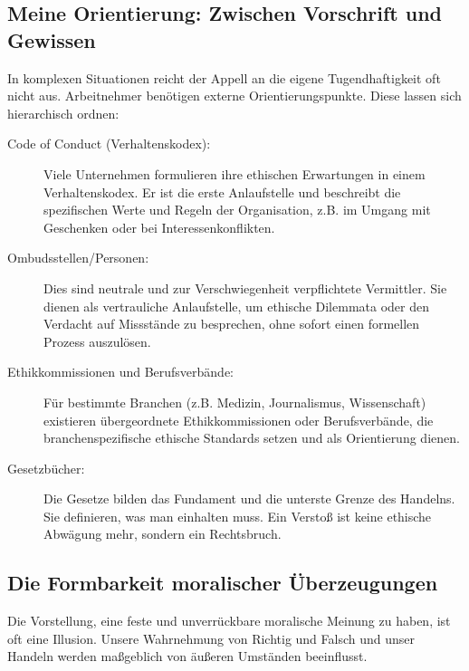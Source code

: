 \documentclass[
    12pt,               %
    a4paper,            %
    ngerman             %
]{scrartcl}
\begin{document}
\subsection{Meine Orientierung: Zwischen Vorschrift und Gewissen}
In komplexen Situationen reicht der Appell an die eigene Tugendhaftigkeit oft nicht aus. Arbeitnehmer benötigen externe Orientierungspunkte. Diese lassen sich hierarchisch ordnen:

\begin{description}
    \item[Code of Conduct (Verhaltenskodex):] Viele Unternehmen formulieren ihre ethischen Erwartungen in einem Verhaltenskodex. Er ist die erste Anlaufstelle und beschreibt die spezifischen Werte und Regeln der Organisation, z.B. im Umgang mit Geschenken oder bei Interessenkonflikten.
    \item[Ombudsstellen/Personen:] Dies sind neutrale und zur Verschwiegenheit verpflichtete Vermittler. Sie dienen als vertrauliche Anlaufstelle, um ethische Dilemmata oder den Verdacht auf Missstände zu besprechen, ohne sofort einen formellen Prozess auszulösen.
    \item[Ethikkommissionen und Berufsverbände:] Für bestimmte Branchen (z.B. Medizin, Journalismus, Wissenschaft) existieren übergeordnete Ethikkommissionen oder Berufsverbände, die branchenspezifische ethische Standards setzen und als Orientierung dienen.
    \item[Gesetzbücher:] Die Gesetze bilden das Fundament und die unterste Grenze des Handelns. Sie definieren, was man einhalten muss. Ein Verstoß ist keine ethische Abwägung mehr, sondern ein Rechtsbruch.
\end{description}

\subsection{Die Formbarkeit moralischer Überzeugungen}

Die Vorstellung, eine feste und unverrückbare moralische Meinung zu haben, ist oft eine Illusion. Unsere Wahrnehmung von Richtig und Falsch und unser Handeln werden maßgeblich von äußeren Umständen beeinflusst.
\end{document}
